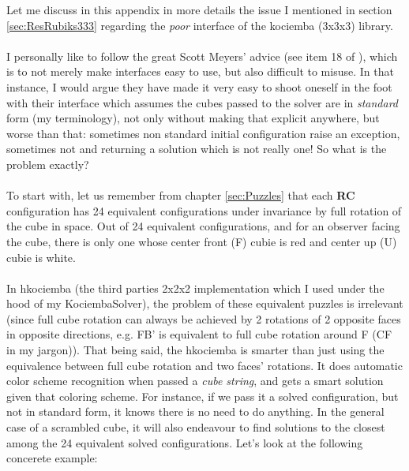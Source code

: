 

\label{sec:Kociemba} %


Let me discuss in this appendix in more details the issue I mentioned in section \ref{sec:ResRubiks333} regarding the \textit{poor} interface of the kociemba (3x3x3) library.
\\
\\
I personally like to follow the great Scott Meyers' advice (see item 18 of \cite{meyers2005effective}), which is to not merely make interfaces easy to use, but also difficult to misuse. In that instance, I would argue they have made it very easy to shoot oneself in the foot with their interface which assumes the cubes passed to the solver are in \textit{standard} form (my terminology), not only without making that explicit anywhere, but worse than that: sometimes non standard initial configuration raise an exception, sometimes not and returning a solution which is not really one! So what is the problem exactly?
\\
\\
To start with, let us remember from chapter \ref{sec:Puzzles} that each \textbf{RC} configuration has 24 equivalent configurations under invariance by full rotation of the cube in space. Out of 24 equivalent configurations, and for an observer facing the cube, there is only one whose center front (F) cubie is red and center up (U) cubie is white.
\\
\\
In hkociemba (the third parties 2x2x2 implementation which I used under the hood of my KociembaSolver), the problem of these equivalent puzzles is irrelevant (since full cube rotation can always be achieved by 2 rotations of 2 opposite faces in opposite directions, e.g. FB' is equivalent to full cube rotation around F (CF in my jargon)). That being said, the hkociemba is smarter than just using the equivalence between full cube rotation and two faces' rotations. It does automatic color scheme recognition when passed a \textit{cube string}, and gets a smart solution given that coloring scheme. For instance, if we pass it a solved configuration, but not in standard form, it knows there is no need to do anything. In the general case of a scrambled cube, it will also endeavour to find solutions to the closest among the 24 equivalent solved configurations. Let's look at the following concerete example:


